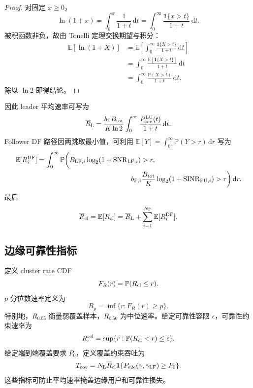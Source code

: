 \documentclass[UTF8,a4paper,11pt]{ctexart}
\newcommand{\E}{\mathbb E}
\newcommand{\Prob}{\mathbb P}
\newcommand{\dd}{\,\mathrm d}
\newcommand{\ind}{\mathbf 1}
\newcommand{\NL}{N_{\mathrm L}}
\newcommand{\NF}{N_{\mathrm F}}
\newcommand{\SINR}{\operatorname{SINR}}
\newcommand{\SNR}{\operatorname{SNR}}
\newcommand{\Btot}{B_{\mathrm{tot}}}
\newcommand{\Pe}{P_{\mathrm{e2e}}}
\newcommand{\Rbar}{\overline R}
\begin{document}
\begin{proof}
对固定 $x\geq0$，
\begin{equation}
 \ln(1+x)=\int_0^x\frac{1}{1+t}\dd t
 =\int_0^\infty\frac{\ind\{x>t\}}{1+t}\dd t.
\end{equation}
被积函数非负，故由 Tonelli 定理交换期望与积分：
\begin{equation}
\begin{split}
 \E[\ln(1+X)]
 &=\E\left[\int_0^\infty
 \frac{\ind\{X>t\}}{1+t}\dd t\right]\\
 &=\int_0^\infty
 \frac{\E[\ind\{X>t\}]}{1+t}\dd t\\
 &=\int_0^\infty
 \frac{\Prob(X>t)}{1+t}\dd t.
\end{split}
\end{equation}
除以 $\ln2$ 即得结论。
\end{proof}

因此 leader 平均速率可写为
\begin{equation}
 \Rbar_{\rm L}
 =
 \frac{b_{\rm L}\Btot}{K\ln2}
 \int_0^\infty
 \frac{P_{\rm cov}^{\rm LU}(t)}{1+t}\dd t.
 \label{eq:mean-leader-rate}
\end{equation}
Follower DF 路径因两跳取最小值，可利用
$\E[Y]=\int_0^\infty\Prob(Y>r)\dd r$ 写为
\begin{equation}
\begin{split}
 \E[R_i^{\rm DF}]
 &=
 \int_0^\infty
 \Prob\bigg(
 B_{{\rm LF},i}\log_2(1+\SNR_{{\rm LF},i})>r,\\
 &\hspace{4.8cm}
 b_{{\rm F},i}\frac{\Btot}{K}
 \log_2(1+\SINR_{{\rm FU},i})>r
 \bigg)\dd r.
\end{split}
\label{eq:mean-df-rate-tail}
\end{equation}
最后
\begin{equation}
 \Rbar_{\rm cl}
 =\E[R_{\rm cl}]
 =\Rbar_{\rm L}+\sum_{i=1}^{\NF}\E[R_i^{\rm DF}].
 \label{eq:mean-cluster-rate}
\end{equation}

\subsection{边缘可靠性指标}

定义 cluster rate CDF
\begin{equation}
 F_R(r)=\Prob(R_{\rm cl}\leq r).
 \label{eq:rate-cdf}
\end{equation}
$p$ 分位数速率定义为
\begin{equation}
 R_p=\inf\{r:F_R(r)\geq p\}.
 \label{eq:quantile-rate}
\end{equation}
特别地，$R_{0.05}$ 衡量弱覆盖样本，$R_{0.50}$ 为中位速率。给定可靠性容限
$\epsilon$，可靠性约束速率为
\begin{equation}
 R_{\epsilon}^{\rm rel}
 =
 \sup\{r:\Prob(R_{\rm cl}<r)\leq\epsilon\}.
 \label{eq:reliability-rate}
\end{equation}
给定端到端覆盖要求 $P_0$，定义覆盖约束吞吐为
\begin{equation}
 T_{\rm cov}
 =
 \NL\Rbar_{\rm cl}\ind\{\Pe(\gamma,\gamma_{\rm LF})\geq P_0\}.
 \label{eq:coverage-constrained-throughput}
\end{equation}
这些指标可防止平均速率掩盖边缘用户和可靠性损失。
\end{document}
